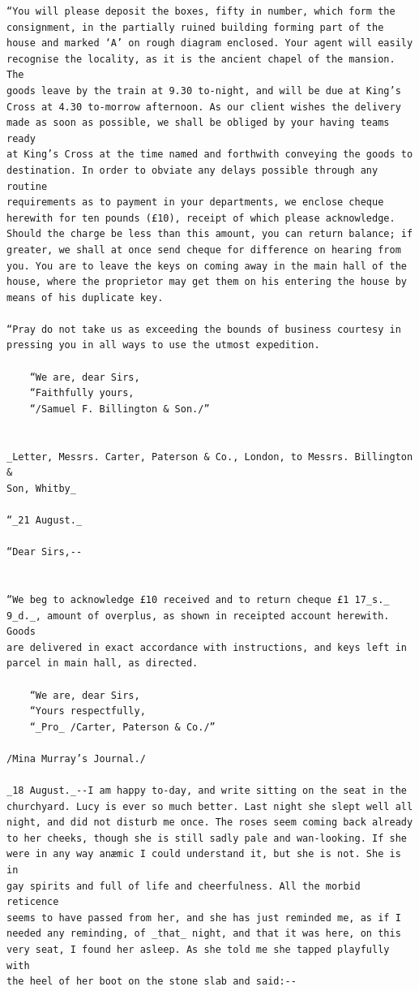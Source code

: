 \documentclass{article}
\begin{document}
\begin{verbatim}
“You will please deposit the boxes, fifty in number, which form the
consignment, in the partially ruined building forming part of the
house and marked ‘A’ on rough diagram enclosed. Your agent will easily
recognise the locality, as it is the ancient chapel of the mansion. The
goods leave by the train at 9.30 to-night, and will be due at King’s
Cross at 4.30 to-morrow afternoon. As our client wishes the delivery
made as soon as possible, we shall be obliged by your having teams ready
at King’s Cross at the time named and forthwith conveying the goods to
destination. In order to obviate any delays possible through any routine
requirements as to payment in your departments, we enclose cheque
herewith for ten pounds (£10), receipt of which please acknowledge.
Should the charge be less than this amount, you can return balance; if
greater, we shall at once send cheque for difference on hearing from
you. You are to leave the keys on coming away in the main hall of the
house, where the proprietor may get them on his entering the house by
means of his duplicate key.

“Pray do not take us as exceeding the bounds of business courtesy in
pressing you in all ways to use the utmost expedition.

    “We are, dear Sirs,
    “Faithfully yours,
    “/Samuel F. Billington & Son./”


_Letter, Messrs. Carter, Paterson & Co., London, to Messrs. Billington &
Son, Whitby_

“_21 August._

“Dear Sirs,--


“We beg to acknowledge £10 received and to return cheque £1 17_s._
9_d._, amount of overplus, as shown in receipted account herewith. Goods
are delivered in exact accordance with instructions, and keys left in
parcel in main hall, as directed.

    “We are, dear Sirs,
    “Yours respectfully,
    “_Pro_ /Carter, Paterson & Co./”

/Mina Murray’s Journal./

_18 August._--I am happy to-day, and write sitting on the seat in the
churchyard. Lucy is ever so much better. Last night she slept well all
night, and did not disturb me once. The roses seem coming back already
to her cheeks, though she is still sadly pale and wan-looking. If she
were in any way anæmic I could understand it, but she is not. She is in
gay spirits and full of life and cheerfulness. All the morbid reticence
seems to have passed from her, and she has just reminded me, as if I
needed any reminding, of _that_ night, and that it was here, on this
very seat, I found her asleep. As she told me she tapped playfully with
the heel of her boot on the stone slab and said:--


\end{verbatim}
\end{document}
